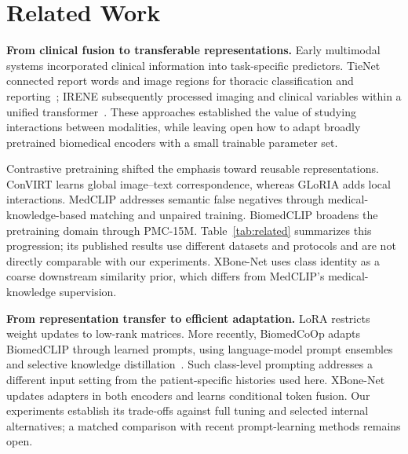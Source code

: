 \documentclass[conference,a4paper]{IEEEtran}
\begin{document}
\section{Related Work}
\textbf{From clinical fusion to transferable representations.}
Early multimodal systems incorporated clinical information into task-specific predictors. TieNet connected report words and image regions for thoracic classification and reporting~\cite{TieNet}; IRENE subsequently processed imaging and clinical variables within a unified transformer~\cite{IRENE}. These approaches established the value of studying interactions between modalities, while leaving open how to adapt broadly pretrained biomedical encoders with a small trainable parameter set.

Contrastive pretraining shifted the emphasis toward reusable representations. ConVIRT learns global image--text correspondence, whereas GLoRIA adds local interactions. MedCLIP addresses semantic false negatives through medical-knowledge-based matching and unpaired training. BiomedCLIP broadens the pretraining domain through PMC-15M. Table~\ref{tab:related} summarizes this progression; its published results use different datasets and protocols and are not directly comparable with our experiments. XBone-Net uses class identity as a coarse downstream similarity prior, which differs from MedCLIP's medical-knowledge supervision.

\textbf{From representation transfer to efficient adaptation.}
LoRA restricts weight updates to low-rank matrices. More recently, BiomedCoOp adapts BiomedCLIP through learned prompts, using language-model prompt ensembles and selective knowledge distillation~\cite{BiomedCoOp}. Such class-level prompting addresses a different input setting from the patient-specific histories used here. XBone-Net updates adapters in both encoders and learns conditional token fusion. Our experiments establish its trade-offs against full tuning and selected internal alternatives; a matched comparison with recent prompt-learning methods remains open.
\end{document}
